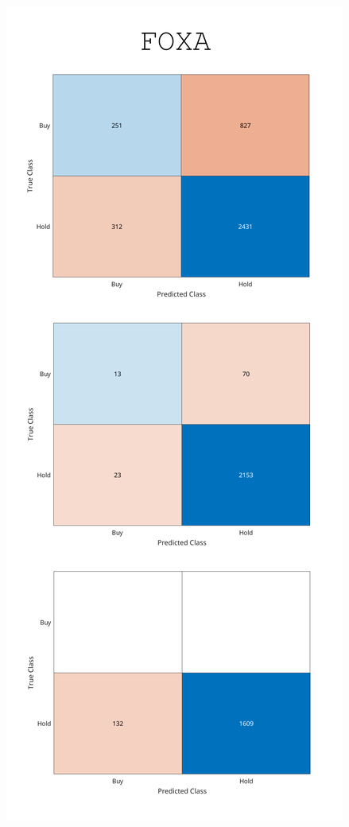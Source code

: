 \documentclass[a4paper,oneside,onecolumn,12pt]{book}
\begin{document}
\begin{figure}[H]
\begin{center}
	\includegraphics[height=0.8\textheight, keepaspectratio]{kep/FOXA2.png}
\end{center}
\end{figure}
\endgroup
\end{document}
